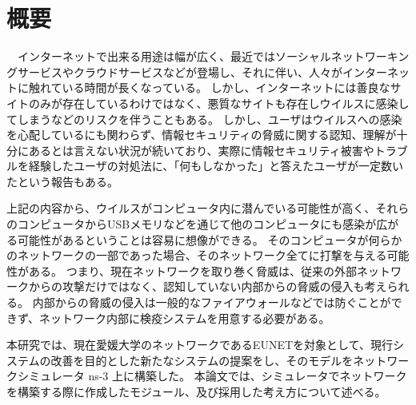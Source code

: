 \chapter*{概要}

　インターネットで出来る用途は幅が広く、最近ではソーシャルネットワーキングサービスやクラウドサービスなどが登場し、それに伴い、人々がインターネットに触れている時間が長くなっている。
しかし、インターネットには善良なサイトのみが存在しているわけではなく、悪質なサイトも存在しウイルスに感染してしまうなどのリスクを伴うこともある。
しかし、ユーザはウイルスへの感染を心配しているにも関わらず、情報セキュリティの脅威に関する認知、理解が十分にあるとは言えない状況が続いており、実際に情報セキュリティ被害やトラブルを経験したユーザの対処法に、「何もしなかった」と答えたユーザが一定数いたという報告もある\cite{joron1}。

上記の内容から、ウイルスがコンピュータ内に潜んでいる可能性が高く、それらのコンピュータからUSBメモリなどを通じて他のコンピュータにも感染が広がる可能性があるということは容易に想像ができる。
そのコンピュータが何らかのネットワークの一部であった場合、そのネットワーク全てに打撃を与える可能性がある。
つまり、現在ネットワークを取り巻く脅威は、従来の外部ネットワークからの攻撃だけではなく、認知していない内部からの脅威の侵入も考えられる。
内部からの脅威の侵入は一般的なファイアウォールなどでは防ぐことができず、ネットワーク内部に検疫システムを用意する必要がある。

本研究では、現在愛媛大学のネットワークであるEUNETを対象として、現行システムの改善を目的とした新たなシステムの提案をし、そのモデルをネットワークシミュレータ ns-3 上に構築した。
本論文では、シミュレータでネットワークを構築する際に作成したモジュール、及び採用した考え方について述べる。